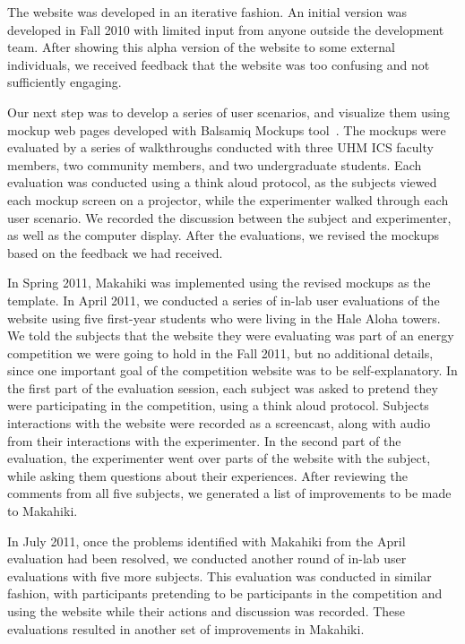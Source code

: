 The website was developed in an iterative fashion. An initial version was developed in Fall 2010 with limited input from anyone outside the development team. After showing this alpha version of the website to some external individuals, we received feedback that the website was too confusing and not sufficiently engaging.

Our next step was to develop a series of user scenarios, and visualize them using mockup web pages developed with Balsamiq Mockups tool~\cite{balsamiq-website}. The mockups were evaluated by a series of walkthroughs conducted with three UHM ICS faculty members, two community members, and two undergraduate students. Each evaluation was conducted using a think aloud protocol, as the subjects viewed each mockup screen on a projector, while the experimenter walked through each user scenario. We recorded the discussion between the subject and experimenter, as well as the computer display. After the evaluations, we revised the mockups based on the feedback we had received.

In Spring 2011, Makahiki was implemented using the revised mockups as the template. In April 2011, we conducted a series of in-lab user evaluations of the website using five first-year students who were living in the Hale Aloha towers. We told the subjects that the website they were evaluating was part of an energy competition we were going to hold in the Fall 2011, but no additional details, since one important goal of the competition website was to be self-explanatory. In the first part of the evaluation session, each subject was asked to pretend they were participating in the competition, using a think aloud protocol. Subjects interactions with the website were recorded as a screencast, along with audio from their interactions with the experimenter. In the second part of the evaluation, the experimenter went over parts of the website with the subject, while asking them questions about their experiences. After reviewing the comments from all five subjects, we generated a list of improvements to be made to Makahiki.

In July 2011, once the problems identified with Makahiki from the April evaluation had been resolved, we conducted another round of in-lab user evaluations with five more subjects. This evaluation was conducted in similar fashion, with participants pretending to be participants in the competition and using the website while their actions and discussion was recorded. These evaluations resulted in another set of improvements in Makahiki.

